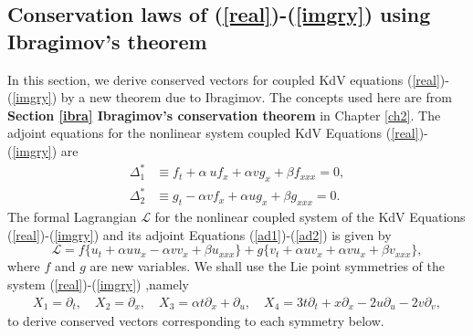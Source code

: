 \subsection{ Conservation laws of (\ref{real})-(\ref{imgry}) using Ibragimov's theorem}
In this section, we derive conserved vectors for coupled KdV equations (\ref{real})-(\ref{imgry}) by a new theorem due to Ibragimov. The concepts used here are from \textbf{Section \ref{ibra} Ibragimov's conservation theorem } in Chapter \ref{ch2}.
The adjoint equations for the nonlinear system coupled KdV Equations (\ref{real})-(\ref{imgry}) are \begin{align} \label{ad1}\Delta_1^{*}& \equiv  f_t+ \alpha \ uf_x+\alpha vg_x+ \beta f_{xxx}=0,\\
\label{ad2}\Delta_2^{*}& \equiv  g_t-\alpha  vf_x+ \alpha ug_x+ \beta g_{xxx}=0.
\end{align} The formal Lagrangian $\mathcal{L}$ for the nonlinear coupled system of the KdV Equations (\ref{real})-(\ref{imgry}) and its adjoint Equations (\ref{ad1})-(\ref{ad2}) is given by \begin{equation} \mathcal{L}= f \{u_t + \alpha u u_x- \alpha v v_x + \beta u_{xxx} \}  + g \{ v_t + \alpha  u v_x + \alpha v u_x + \beta v_{xxx}\},
\end{equation} where $f$ and $g$ are new variables.
We shall use the Lie point symmetries of the system (\ref{real})-(\ref{imgry}) ,namely \begin{align}
X_1 = \partial_t, \quad 
X_2 = \partial_x, \quad 
X_3 = \alpha t \partial_x+  \partial_u,\quad 
X_4 =3t \partial_t + x \partial_x - 2 u  \partial_u-2 v  \partial_v,
\end{align} to derive conserved vectors corresponding to each symmetry below.
